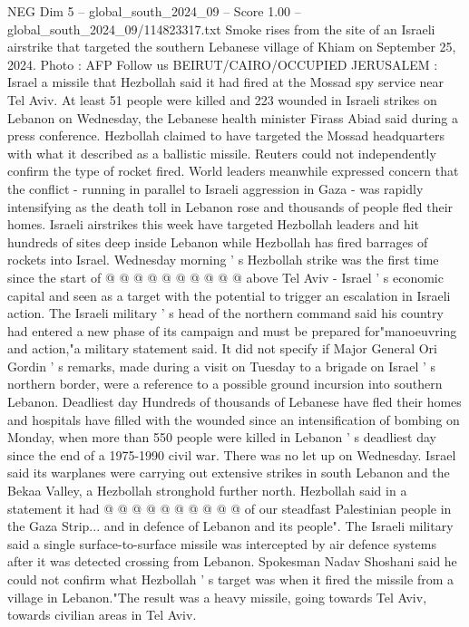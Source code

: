 \begin{textsample}{NEG Dim 5 – global\_south\_2024\_09 – Score 1.00 – global\_south\_2024\_09/114823317.txt}  \label{ex:f5_neg_197}
Smoke rises from the site of an Israeli airstrike that targeted the southern Lebanese village of Khiam on September 25, 2024.
Photo : AFP Follow us BEIRUT/CAIRO/OCCUPIED JERUSALEM : Israel a missile that Hezbollah said it had fired at the Mossad spy service near Tel Aviv.
At least 51 people were killed and 223 wounded in Israeli strikes on Lebanon on Wednesday, the Lebanese health minister Firass Abiad said during a press conference.
Hezbollah claimed to have targeted the Mossad headquarters with what it described as a ballistic missile.
Reuters could not independently confirm the type of rocket fired.
World leaders meanwhile expressed concern that the conflict - running in parallel to Israeli aggression in Gaza - was rapidly intensifying as the death toll in Lebanon rose and thousands of people fled their homes.
Israeli airstrikes this week have targeted Hezbollah leaders and hit hundreds of sites deep inside Lebanon while Hezbollah has fired barrages of rockets into Israel.
Wednesday morning ' s Hezbollah strike was the first time since the start of @ @ @ @ @ @ @ @ @ @ above Tel Aviv - Israel ' s economic capital and seen as a target with the potential to trigger an escalation in Israeli action.
The Israeli military ' s head of the northern command said his country had entered a new phase of its campaign and must be prepared for"manoeuvring and action,"a military statement said.
It did not specify if Major General Ori Gordin ' s remarks, made during a visit on Tuesday to a brigade on Israel ' s northern border, were a reference to a possible ground incursion into southern Lebanon.
Deadliest day Hundreds of thousands of Lebanese have fled their homes and hospitals have filled with the wounded since an intensification of bombing on Monday, when more than 550 people were killed in Lebanon ' s deadliest day since the end of a 1975-1990 civil war.
There was no let up on Wednesday.
Israel said its warplanes were carrying out extensive strikes in south Lebanon and the Bekaa Valley, a Hezbollah stronghold further north.
Hezbollah said in a statement it had @ @ @ @ @ @ @ @ @ @ of our steadfast Palestinian people in the Gaza Strip... and in defence of Lebanon and its people".
The Israeli military said a single surface-to-surface missile was intercepted by air defence systems after it was detected crossing from Lebanon.
Spokesman Nadav Shoshani said he could not confirm what Hezbollah ' s target was when it fired the missile from a village in Lebanon."The result was a heavy missile, going towards Tel Aviv, towards civilian areas in Tel Aviv.

\end{textsample}
